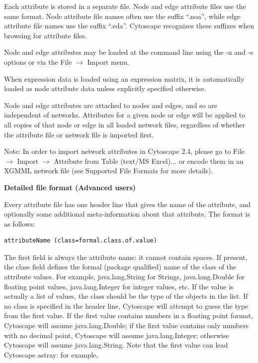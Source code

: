  Each attribute is stored in a separate file. Node and edge attribute files use
the same format. Node attribute file names often use the suffix ``.noa'', while
edge attribute file names use the suffix ``.eda''. Cytoscape recognizes these
suffixes when browsing for attribute files. 

 Node and edge attributes may be loaded at the command line using the -n and -e
options or via the File $\rightarrow$ Import menu. 

 When expression data is loaded using an expression matrix, it is automatically
loaded as node attribute data unless explicitly specified otherwise. 



 Node and edge attributes are attached to nodes and edges, and so are
independent of networks. Attributes for a given node or edge will be applied to
all copies of that node or edge in all loaded network files, regardless of
whether the attribute file or network file is imported first. 

 Note: In order to import network attributes in Cytoscape 2.4, please go to
File $\rightarrow$ Import $\rightarrow$ Attribute from Table (text/MS Excel)...
or encode them in an XGMML network file (see Supported File Formats for more
details). 

 \textbf{Detailed file format (Advanced users)}

 Every attribute file has one header line that gives the name of the attribute,
and optionally some additional meta-information about that attribute. The
format is as follows: 

 \begin{verbatim}
attributeName (class=formal.class.of.value)
\end{verbatim}

 The first field is always the attribute name: it cannot contain spaces. If
present, the class field defines the formal (package qualified) name of the
class of the attribute values. For example, java.lang.String for Strings,
java.lang.Double for floating point values, java.lang.Integer for integer
values, etc. If the value is actually a list of values, the class should be the
type of the objects in the list. If no class is specified in the header line,
Cytoscape will attempt to guess the type from the first value. If the first
value contains numbers in a floating point format, Cytoscape will assume
java.lang.Double; if the first value contains only numbers with no decimal
point, Cytoscape will assume java.lang.Integer; otherwise Cytoscape will assume
java.lang.String. Note that the first value can lead Cytoscape astray: for
example, 

